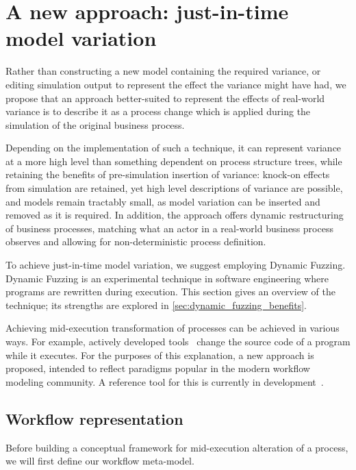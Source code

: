 \documentclass[12pt]{llncs}  %
\begin{document}
\section{A new approach: just-in-time model variation}
Rather than constructing a new model containing the required variance, or
editing simulation output to represent the effect the variance might have had,
we propose that an approach better-suited to represent the effects of real-world
variance is to describe it as a process change which is applied
during the simulation of the original business process.
\par

Depending on the implementation of such a technique, it can represent variance
at a more high level than something dependent on process structure trees, while
retaining the benefits of pre-simulation insertion of variance: knock-on effects
from simulation are retained, yet high level descriptions of variance are
possible, and models remain tractably small, as model variation can be inserted
and removed as it is required. In addition, the approach offers dynamic
restructuring of business processes, matching what an actor in a real-world
business process observes and allowing for non-deterministic process definition.
\par

\label{sec:dynamic_fuzzing_explained}
To achieve just-in-time model variation, we suggest employing Dynamic Fuzzing.
Dynamic Fuzzing is an experimental technique in software engineering where programs are rewritten during execution. This section gives
an overview of the technique; its strengths are explored in
\cref{sec:dynamic_fuzzing_benefits}.
\par

Achieving mid-execution transformation of processes can be achieved in various
ways. For example, actively developed tools~\citep{pdsf} change the source code
of a program while it executes. For the purposes of this explanation, a new
approach is proposed, intended to reflect paradigms popular in the modern
workflow modeling community. A reference tool for this is currently in
development~\citep{workflowgraphs}.

\subsection{Workflow representation}
Before building a conceptual framework for mid-execution alteration of a
process, we will first define our workflow meta-model.
\par
\end{document}
